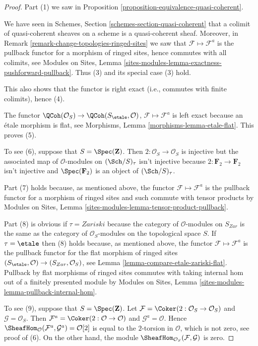 \begin{proof}
Part (1) we saw in
Proposition \ref{proposition-equivalence-quasi-coherent}.

\medskip\noindent
We have seen in
Schemes, Section \ref{schemes-section-quasi-coherent}
that a colimit of quasi-coherent sheaves on a scheme is a quasi-coherent
sheaf. Moreover, in
Remark \ref{remark-change-topologies-ringed-sites}
we saw that $\mathcal{F} \mapsto \mathcal{F}^a$ is the pullback functor
for a morphism of ringed sites, hence commutes with all colimits, see
Modules on Sites, Lemma
\ref{sites-modules-lemma-exactness-pushforward-pullback}.
Thus (3) and its special case (3) hold.

\medskip\noindent
This also shows that the functor is right exact (i.e., commutes with
finite colimits), hence (4).

\medskip\noindent
The functor $\QCoh(\mathcal{O}_S) \to
\QCoh(S_\etale, \mathcal{O})$,
$\mathcal{F} \mapsto \mathcal{F}^a$
is left exact because an \'etale morphism is flat, see
Morphisms, Lemma \ref{morphisms-lemma-etale-flat}.
This proves (5).

\medskip\noindent
To see (6), suppose that $S = \Spec(\mathbf{Z})$.
Then $2 : \mathcal{O}_S \to \mathcal{O}_S$ is injective but the associated
map of $\mathcal{O}$-modules on $(\Sch/S)_\tau$ isn't
injective because $2 : \mathbf{F}_2 \to \mathbf{F}_2$ isn't injective
and $\Spec(\mathbf{F}_2)$ is an object of $(\Sch/S)_\tau$.

\medskip\noindent
Part (7) holds because, as mentioned above, the functor
$\mathcal{F} \mapsto \mathcal{F}^a$ is the pullback functor
for a morphism of ringed sites and such commute with tensor
products by Modules on Sites, Lemma
\ref{sites-modules-lemma-tensor-product-pullback}.

\medskip\noindent
Part (8) is obvious if $\tau = Zariski$ because the category of
$\mathcal{O}$-modules on $S_{Zar}$ is the same as the category
of $\mathcal{O}_S$-modules on the topological space $S$.
If $\tau = \etale$ then (8) holds because, as mentioned above,
the functor $\mathcal{F} \mapsto \mathcal{F}^a$ is the pullback functor
for the flat morphism of ringed sites
$(S_\etale, \mathcal{O}) \to (S_{Zar}, \mathcal{O}_S)$, see
Lemma \ref{lemma-compare-etale-zariski-flat}.
Pullback by flat morphisms of ringed sites commutes with
taking internal hom out of a finitely presented module by
Modules on Sites, Lemma \ref{sites-modules-lemma-pullback-internal-hom}.

\medskip\noindent
To see (9), suppose that $S = \Spec(\mathbf{Z})$. Let
$\mathcal{F} = \Coker(2 : \mathcal{O}_S \to \mathcal{O}_S)$
and $\mathcal{G} = \mathcal{O}_S$.
Then $\mathcal{F}^a = \Coker(2 : \mathcal{O} \to \mathcal{O})$
and $\mathcal{G}^a = \mathcal{O}$.
Hence
$\SheafHom_\mathcal{O}(\mathcal{F}^a, \mathcal{G}^a) = \mathcal{O}[2]$
is equal to the $2$-torsion in $\mathcal{O}$, which is not zero,
see proof of (6). On the other hand, the module
$\SheafHom_{\mathcal{O}_S}(\mathcal{F}, \mathcal{G})$
is zero.


\end{proof}
